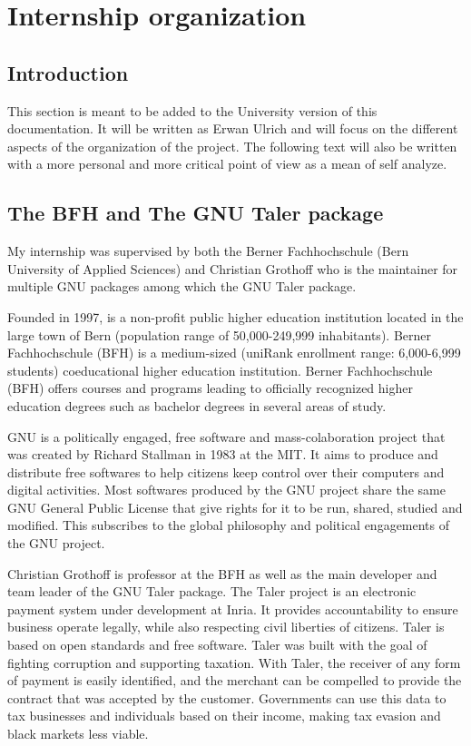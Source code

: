 \section{Internship organization} 
	\subsection{Introduction}

This section is meant to be added to the University version of this documentation. It will be written as Erwan Ulrich and will focus on the different aspects of the organization of the project. The following text will also be written with a more personal and more critical point of view as a mean of self analyze.

	\subsection{The BFH and The GNU Taler package}
My internship was supervised by both the Berner Fachhochschule (Bern University of Applied Sciences) and Christian Grothoff who is the maintainer for multiple GNU packages among which the GNU Taler package.

Founded in 1997,  is a non-profit public higher education institution located in the large town of Bern (population range of 50,000-249,999 inhabitants). Berner Fachhochschule (BFH) is a medium-sized (uniRank enrollment range: 6,000-6,999 students) coeducational higher education institution. Berner Fachhochschule (BFH) offers courses and programs leading to officially recognized higher education degrees such as bachelor degrees in several areas of study.

GNU is a politically engaged, free software and mass-colaboration project that was created by Richard Stallman in 1983 at the MIT. It aims to produce and distribute free softwares to help citizens keep control over their computers and digital activities. Most softwares produced by the GNU project share the same GNU General Public License that give rights for it to be run, shared, studied and modified. This subscribes to the global philosophy and political engagements of the GNU project.

Christian Grothoff is professor at the BFH as well as the main developer and team leader of the GNU Taler package.
The Taler project is an electronic payment system under development at Inria.
It provides accountability to ensure business operate legally, while also respecting civil liberties of citizens. Taler is based on open standards and free software.
Taler was built with the goal of fighting corruption and supporting taxation. With Taler, the receiver of any form of payment is easily identified, and the merchant can be compelled to provide the contract that was accepted by the customer. Governments can use this data to tax businesses and individuals based on their income, making tax evasion and black markets less viable. 

